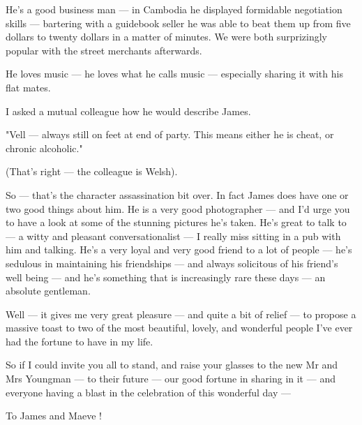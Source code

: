 He's a good business man --- in Cambodia he displayed formidable
negotiation skills --- bartering with a guidebook seller he was able
to beat them up from five dollars to twenty dollars in a matter of
minutes. We were both surprizingly popular with the street merchants
afterwards.

He loves music --- he loves what he calls music --- especially sharing
it with his flat mates.

I asked a mutual colleague how he would describe James.

"Vell --- always still on feet at end of party. This means either he
is cheat, or chronic alcoholic."

(That's right --- the colleague is Welsh).

\bigskip
So --- that's the character assassination bit over. In fact James does
have one or two good things about him. He {\notefont is} a very good
photographer --- and I'd urge you to have a look at some of the
stunning pictures he's taken. He's great to talk to --- a witty and
pleasant conversationalist --- I really miss sitting in a pub with him
and talking. He's a very loyal and very good friend to a lot of people
--- he's sedulous in maintaining his friendships --- and always
solicitous of his friend's well being --- and he's something that is
increasingly rare these days --- an absolute gentleman.

\bigskip{}

Well --- it gives me very great pleasure --- and quite a bit of relief ---
to propose a massive toast to two of the most beautiful, lovely, and
wonderful people I've ever had the fortune to have in my life.

So if I could invite you all to stand, and raise your glasses to the
new Mr and Mrs Youngman --- to their future --- our good fortune in
sharing in it --- and everyone having a blast in the celebration of
this wonderful day ---

To James and Maeve !

\bye

